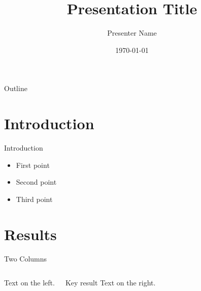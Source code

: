 \documentclass{beamer}
\title{Presentation Title}
\author{Presenter Name}
\date{\today}
\begin{document}
\begin{frame}
  \titlepage
\end{frame}

\begin{frame}{Outline}
  \tableofcontents
\end{frame}

\section{Introduction}
\begin{frame}{Introduction}
  \begin{itemize}
    \item First point
    \item Second point \pause
    \item Third point
  \end{itemize}
\end{frame}

\section{Results}
\begin{frame}{Two Columns}
  \begin{columns}
    Text on the left.
    \begin{block}{Key result}
      Text on the right.
    \end{block}
  \end{columns}
\end{frame}
\end{document}
